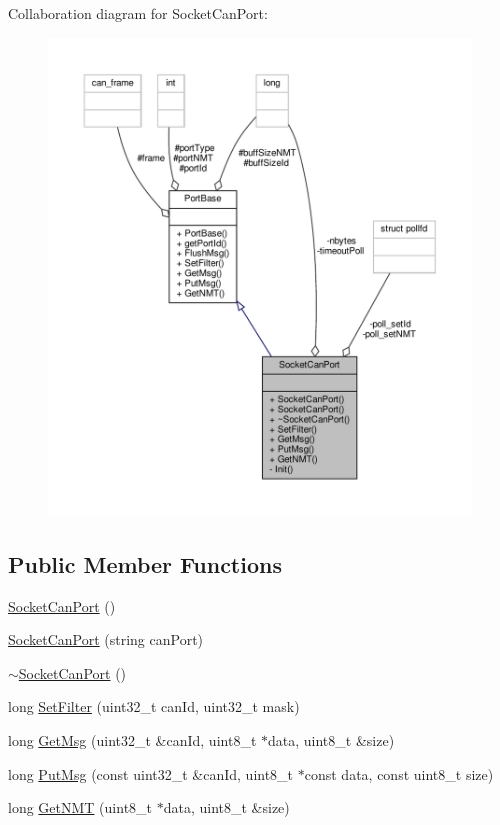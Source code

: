 Collaboration diagram for Socket\+Can\+Port\+:
\nopagebreak
\begin{figure}[H]
\begin{center}
\leavevmode
\includegraphics[width=350pt]{classSocketCanPort__coll__graph}
\end{center}
\end{figure}
\subsection*{Public Member Functions}
\begin{DoxyCompactItemize}
\item 
\hyperlink{classSocketCanPort_af3593609acea236b10646732e277837f}{Socket\+Can\+Port} ()
\item 
\hyperlink{classSocketCanPort_a087bc07f3c1658e3cb994d85fcb3da5e}{Socket\+Can\+Port} (string can\+Port)
\item 
\hyperlink{classSocketCanPort_a0d004347e49110daa1ee29e1d1bc85c0}{$\sim$\+Socket\+Can\+Port} ()
\item 
long \hyperlink{classSocketCanPort_a1a5d0866524dae11ddff0d1ac22e0dd5}{Set\+Filter} (uint32\+\_\+t can\+Id, uint32\+\_\+t mask)
\item 
long \hyperlink{classSocketCanPort_aa9684efc602da057cb4928d52395af33}{Get\+Msg} (uint32\+\_\+t \&can\+Id, uint8\+\_\+t $\ast$data, uint8\+\_\+t \&size)
\item 
long \hyperlink{classSocketCanPort_a9375a0c1e33978c83ebd188100898633}{Put\+Msg} (const uint32\+\_\+t \&can\+Id, uint8\+\_\+t $\ast$const data, const uint8\+\_\+t size)
\item 
long \hyperlink{classSocketCanPort_a2efe27bd3bb8c8127c89925e1e21535a}{Get\+N\+MT} (uint8\+\_\+t $\ast$data, uint8\+\_\+t \&size)
\end{DoxyCompactItemize}
